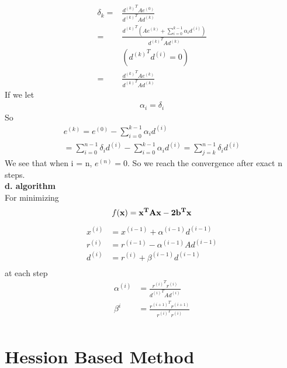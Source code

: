 \documentclass[a4paper]{article}
\begin{document}
\begin{align*}
	\delta_k  = & \frac{{d^{(k)}}^T A e^{(0)}}{{d^{(k)}}^T A d^{(k)}} \\
			  = & \frac{{d^{(k)}}^T ( A e^{(k)} + \sum_{i=0}^{k-1} \alpha_i d^{(i)})}{{d^{(k)}}^T A d^{(k)}} \\
                             & ({d^{(k)}}^T d^{(i)} = 0 ) \\
			 = & \frac{{d^{(k)}}^T A e^{(k)}}{{d^{(k)}}^T A d^{(k)}}
\end{align*}
If we let
\begin{align*}
	\alpha_i = \delta_i
\end{align*}
So
\begin{align*}
	e^{(k)} = e^{(0)} - \sum_{i=0}^{k-1} \alpha_i d^{(i)} \\
	        = \sum_{i=0}^{n-1} \delta_i d^{(i)} - \sum_{i=0}^{k-1} \alpha_i d^{(i)}
	        = \sum_{j=k}^{n-1} \delta_i d^{(i)}
\end{align*}
We see that when i = n, $e^{(n)} = 0$. So we reach the convergence after exact n steps.\\
{\bf d. algorithm}\\
For minimizing
\begin{align*}
f(\bf x) = {\bf x}^T A {\bf x} - 2b^T {\bf x}
\end{align*}
\begin{align*}
x^{(i)} & =  x^{(i-1)} + \alpha^{(i-1)}  d^{(i-1)}\\
r^{(i)} & =   r^{(i-1)} - \alpha^{(i-1)} A  d^{(i-1)}\\
d^{(i)} & =  r^{(i)} + \beta^{(i-1)} d^{(i-1)}\\
\end{align*}
at each step
\begin{align*}
\alpha^{(i)} & = \frac{{r^{(i)}}^T r^{(i)}}{ {d^{(i)}}^T A  d^{(i)}}\\
\beta^i & = \frac{{ r^{(i+1)}}^T r^{(i+1)}}{{r^{(i)}}^T r^{(i)}}\\
\end{align*}
\section{Hession Based Method}
\end{document}

